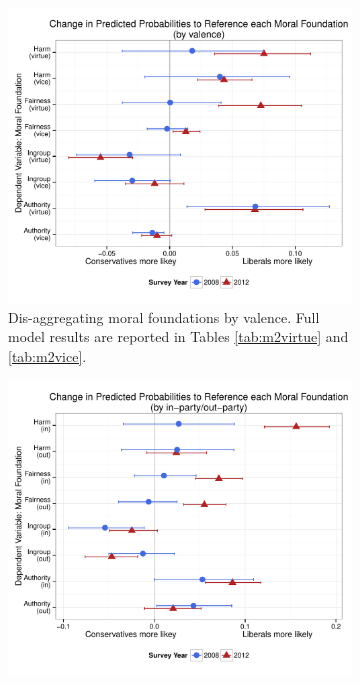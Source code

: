 \documentclass[12pt]{article}
\begin{document}
\begin{figure}[h]
  \centering
  \caption{Difference in predicted probabilities to reference each moral foundation between liberals and conservatives, holding all other control variables at their respective means (along with 95\% confidence intervals). Positive values indicate that liberals are more likely to reference the respective moral foundations than conservatives, and vice versa. Estimates are based on individual logit models for each foundation.}\label{fig:appD4toD6}
  \begin{subfigure}[t]{0.49\textwidth}
    \includegraphics[scale=.4]{../calc/fig/appD4val.pdf}
\caption{Dis-aggregating moral foundations by valence. Full model results are reported in Tables \ref{tab:m2virtue} and \ref{tab:m2vice}.}\label{fig:appD4val}
  \end{subfigure}
  \begin{subfigure}[t]{0.49\textwidth}
    \includegraphics[scale=.4]{../calc/fig/appD5inout.pdf}

\end{subfigure}
\end{figure}
\end{document}
